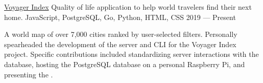 \showoff
{\textcolor{my-blue}{\href{https://voyager-index.herokuapp.com}{Voyager Index}}}
{Quality of life application to help world travelers find their next home.}
{JavaScript, PostgreSQL, Go, Python, HTML, CSS}
{2019 --- Present}

A world map of over 7,000 cities ranked by user-selected filters. Personally spearheaded the development of the server and CLI for the Voyager Index project. Specific contributions included standardizing server interactions with the database, hosting the PostgreSQL database on a personal Raspberry Pi, and presenting the .

